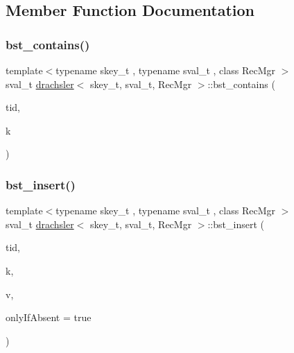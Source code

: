 \subsection{Member Function Documentation}
\mbox{\label{classdrachsler_abc170bf0d3bf7dc4013ec9206d11eaec}} 
\subsubsection{\texorpdfstring{bst\+\_\+contains()}{bst\_contains()}}
{\footnotesize\ttfamily template$<$typename skey\+\_\+t , typename sval\+\_\+t , class Rec\+Mgr $>$ \\
sval\+\_\+t \hyperlink{classdrachsler}{drachsler}$<$ skey\+\_\+t, sval\+\_\+t, Rec\+Mgr $>$\+::bst\+\_\+contains (\begin{DoxyParamCaption}\item[{const int}]{tid,  }\item[{skey\+\_\+t}]{k }\end{DoxyParamCaption})}

\mbox{\label{classdrachsler_aa3ac36b65117e6a719eafa17a7aa487f}} 
\subsubsection{\texorpdfstring{bst\+\_\+insert()}{bst\_insert()}}
{\footnotesize\ttfamily template$<$typename skey\+\_\+t , typename sval\+\_\+t , class Rec\+Mgr $>$ \\
sval\+\_\+t \hyperlink{classdrachsler}{drachsler}$<$ skey\+\_\+t, sval\+\_\+t, Rec\+Mgr $>$\+::bst\+\_\+insert (\begin{DoxyParamCaption}\item[{const int}]{tid,  }\item[{skey\+\_\+t}]{k,  }\item[{sval\+\_\+t}]{v,  }\item[{bool}]{only\+If\+Absent = {\ttfamily true} }\end{DoxyParamCaption})}

\mbox{\label{classdrachsler_adc53a3bc2cdb6511253e3bd2a0b77c52}} 
